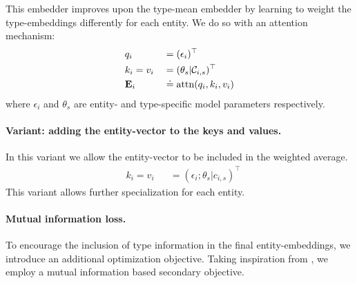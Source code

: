 This embedder improves upon the type-mean embedder by learning to weight the type-embeddings differently for each entity. We do so with an attention mechanism:
\begin{align}
    & {q}_i             && =        ( \epsilon_i )^\top \\
    & {k}_i = {v}_i     && =        ( \theta_s | \mathcal{C}_{i,s})^\top \\
    & \mathbf{E}_i         && \overset{\textbf{.}}{=}  \mathrm{attn}(q_i, k_i, v_i)
\end{align}
where $\epsilon_i$ and $\theta_s$ are entity- and type-specific model parameters respectively.

\paragraph{Variant: adding the entity-vector to the keys and values.}
In this variant we allow the entity-vector to be included in the weighted average.
\begin{align}
    & {k}_i = {v}_i     && =        ( \epsilon_i ; \theta_s | c_{i,s})^\top 
\end{align}
This variant allows further specialization for each entity.

\paragraph{Mutual information loss.}
To encourage the inclusion of type information in the final entity-embeddings, we introduce an additional optimization objective. Taking inspiration from , we employ a mutual information based secondary objective.



